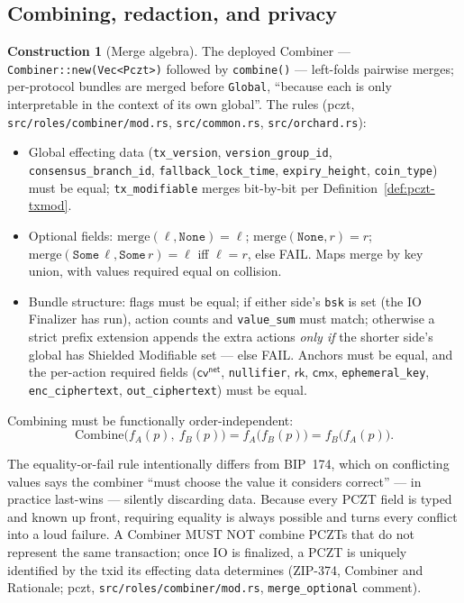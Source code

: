 \documentclass[11pt,a4paper]{article}
\theoremstyle{definition}
\newtheorem{construction}[theorem]{Construction}
\newcommand{\cmx}{\mathsf{cmx}}
\newcommand{\cvsym}{\mathsf{cv}}
\newcommand{\rk}{\mathsf{rk}}
\begin{document}
\subsection{Combining, redaction, and privacy}\label{sec:pczt-combine}

\begin{construction}[Merge algebra]\label{def:pczt-merge}
The deployed Combiner --- \texttt{Combiner::new(Vec<Pczt>)} followed by
\texttt{combine()} ---
left-folds pairwise merges; per-protocol bundles are merged before
\texttt{Global}, ``because each is only interpretable in the context of
its own global''. The rules (\textsf{pczt},
\texttt{src/roles/combiner/mod.rs}, \texttt{src/common.rs},
\texttt{src/orchard.rs}):
\begin{itemize}
\item Global effecting data (\texttt{tx\_version},
  \texttt{version\_group\_id}, \texttt{consensus\_branch\_id},
  \texttt{fallback\_lock\_time}, \texttt{expiry\_height},
  \texttt{coin\_type}) must be equal; \texttt{tx\_modifiable} merges
  bit-by-bit per Definition~\ref{def:pczt-txmod}.
\item Optional fields:
  $\mathrm{merge}(\ell, \texttt{None}) = \ell$;
  $\mathrm{merge}(\texttt{None}, r) = r$;
  $\mathrm{merge}(\texttt{Some}\,\ell, \texttt{Some}\,r) = \ell$ iff
  $\ell = r$, else FAIL. Maps merge by key union, with values required
  equal on collision.
\item Bundle structure: flags must be equal; if either side's
  \texttt{bsk} is set (the IO Finalizer has run), action counts and
  \texttt{value\_sum} must match; otherwise a strict prefix extension
  appends the extra actions \emph{only if} the shorter side's global has
  Shielded Modifiable set --- else FAIL. Anchors must be equal, and the
  per-action required fields ($\cvsym^{\mathsf{net}}$, \texttt{nullifier},
  $\rk$, $\cmx$, \texttt{ephemeral\_key}, \texttt{enc\_ciphertext},
  \texttt{out\_ciphertext}) must be equal.
\end{itemize}
Combining must be functionally order-independent:
\[
\mathrm{Combine}\bigl(f_A(p),\ f_B(p)\bigr)
= f_A\bigl(f_B(p)\bigr) = f_B\bigl(f_A(p)\bigr).
\]
\end{construction}

The equality-or-fail rule intentionally differs from BIP~174, which on
conflicting values says the combiner ``must choose the value it considers
correct'' --- in practice last-wins --- silently discarding data. Because
every PCZT field is typed and known up front, requiring equality is
always possible and turns every conflict into a loud failure. A Combiner
MUST NOT combine PCZTs that do not represent the same transaction; once
IO is finalized, a PCZT is uniquely identified by the txid its effecting
data determines (ZIP-374, Combiner and Rationale; \textsf{pczt},
\texttt{src/roles/combiner/mod.rs}, \texttt{merge\_optional} comment).
\end{document}
